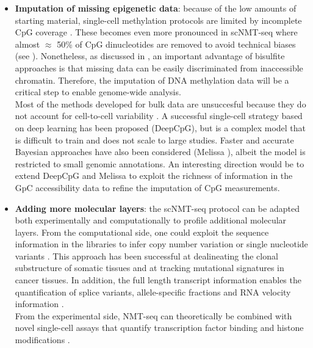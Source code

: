\begin{itemize}
	\item \textbf{Imputation of missing epigenetic data}: because of the low amounts of starting material, single-cell methylation protocols are limited by incomplete CpG coverage \cite{Angermueller2017}. These becomes even more pronounced in scNMT-seq where almost $\approx$ 50\% of CpG dinucleotides are removed to avoid technical biases (see ). Nonetheless, as discussed in , an important advantage of bisulfite approaches is that missing data can be easily discriminated from inaccessible chromatin. Therefore, the imputation of DNA methylation data will be a critical step to enable genome-wide analysis.\\
	Most of the methods developed for bulk data are unsuccesful because they do not account for cell-to-cell variability \cite{Angermueller2017}. A successful single-cell strategy based on deep learning has been proposed (DeepCpG\cite{Angermueller2017}), but is a complex model that is difficult to train and does not scale to large studies. Faster and accurate Bayesian approaches have also been considered (Melissa \cite{Kapourani2018b}), albeit the model is restricted to small genomic annotations. An interesting direction would be to extend DeepCpG and Melissa to exploit the richness of information in the GpC accessibility data to refine the imputation of CpG measurements.

	\item \textbf{Adding more molecular layers}: the scNMT-seq protocol can be adapted both experimentally and computationally to profile additional molecular layers. From the computational side, one could exploit the sequence information in the libraries to infer copy number variation or single nucleotide variants \cite{Poirion2018,Fan2018,McCarthy2018,Enge2017}. This approach has been successful at dealineating the clonal substructure of somatic tissues and at tracking mutational signatures in cancer tissues. In addition, the full length transcript information enables the quantification of splice variants\cite{Huang2017}, allele-specific fractions\cite{Deng2014} and RNA velocity information \cite{LaManno2018}.\\
	From the experimental side, NMT-seq can theoretically be combined with novel single-cell assays that quantify transcription factor binding \cite{Moudgil2019} and histone modifications \cite{Kaya-Okur2019}.


\end{itemize}
